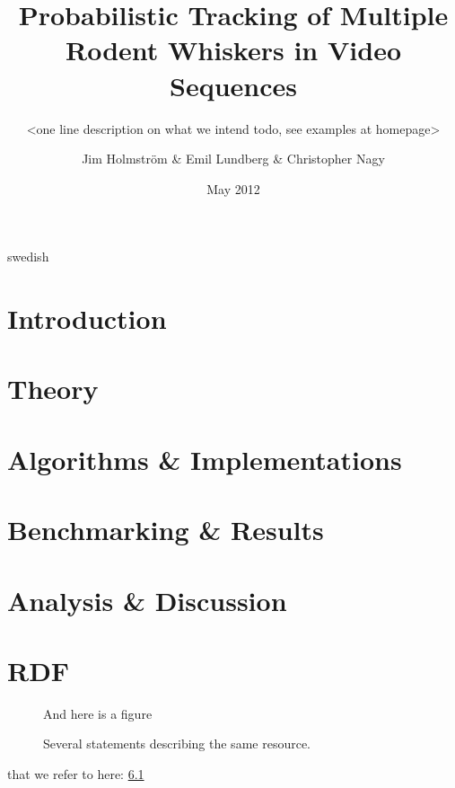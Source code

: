 \documentclass[a4paper,11pt]{kth-mag}
\title{
    Probabilistic Tracking of Multiple Rodent Whiskers in Video Sequences
}
\subtitle{
    <one line description on what we intend todo, see examples at homepage> 
}
\author{
    Jim Holmstr\"{o}m \& 
    Emil Lundberg \& 
    Christopher Nagy
}
\date{May 2012}
\begin{document}
\frontmatter
\pagestyle{empty}
\removepagenumbers
\maketitle
{}
\begin{abstract}
    
\end{abstract}
\clearpage
\begin{foreignabstract}{swedish}
    
\end{foreignabstract}
\clearpage
\tableofcontents*
\mainmatter
\pagestyle{newchap}
\chapter{Introduction}
    \label{sec:introduction}
    

\chapter{Theory}
    \label{sec:theory}
    

\chapter{Algorithms \& Implementations}
    \label{sec:algorithms_implementations}
    


\chapter{Benchmarking \& Results}
    \label{sec:benchmarks_results}
    

\chapter{Analysis \& Discussion}
    \label{sec:analysis_discussion}
    


\appendix
\addappheadtotoc

\chapter{RDF}\label{appA}


\begin{figure}[ht]
\begin{center}
And here is a figure
\caption{\small{Several statements describing the same resource.}}\label{RDF_4}
\end{center}
\end{figure}

that we refer to here: \ref{RDF_4}
\end{document}
